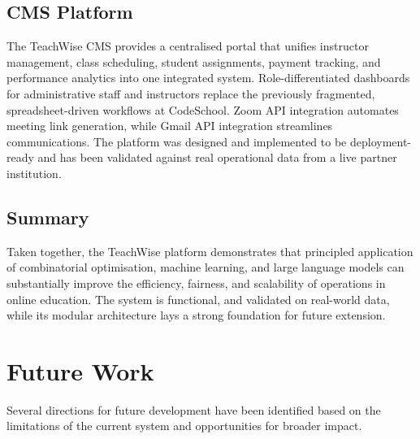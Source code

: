 \subsection{CMS Platform}
The TeachWise CMS provides a centralised portal that unifies instructor management, class scheduling, student assignments, payment tracking, and performance analytics into one integrated system. Role-differentiated dashboards for administrative staff and instructors replace the previously fragmented, spreadsheet-driven workflows at CodeSchool. Zoom API integration automates meeting link generation, while Gmail API integration streamlines communications. The platform was designed and implemented to be deployment-ready and has been validated against real operational data from a live partner institution.

\subsection{Summary}
Taken together, the TeachWise platform demonstrates that principled application of combinatorial optimisation, machine learning, and large language models can substantially improve the efficiency, fairness, and scalability of operations in online education. The system is functional, and validated on real-world data, while its modular architecture lays a strong foundation for future extension.

\section{Future Work}
\label{sec:futurework}

Several directions for future development have been identified based on the limitations of the current system and opportunities for broader impact.

